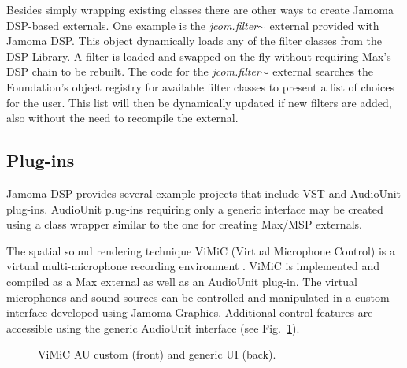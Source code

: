 \documentclass[twoside,10pt]{article}
\begin{document}
\noindent Besides simply wrapping existing classes there are other ways to create Jamoma DSP-based externals. One example is the \emph{jcom.filter$\sim$} external provided with Jamoma DSP.  This object dynamically loads any of the filter classes from the DSP Library. A filter is loaded and swapped on-the-fly without requiring Max's DSP chain to be rebuilt.  The code for the \emph{jcom.filter$\sim$} external searches the Foundation's object registry for available filter classes to present a list of choices for the user.  This list will then be dynamically updated if new filters are added, also without the need to recompile the external.   


\subsection{Plug-ins}

Jamoma DSP provides several example projects that include VST and AudioUnit plug-ins.  AudioUnit plug-ins requiring only a generic interface may be created using a class wrapper similar to the one for creating Max/MSP externals.  

The spatial sound rendering technique ViMiC (Virtual Microphone Control) is a virtual multi-microphone recording environment \cite{CMJ08-VIMIC}.  ViMiC is implemented and compiled as a Max external as well as an AudioUnit plug-in. The virtual microphones and sound sources can be controlled and manipulated in a custom interface developed using Jamoma Graphics.  Additional control features are accessible using the generic AudioUnit interface (see Fig.~\ref{fig:vimic}).


\begin{figure}[hb]
\centerline{}
\caption{ViMiC AU custom (front) and generic UI (back).}
\label{fig:vimic}
\end{figure}
\end{document}
